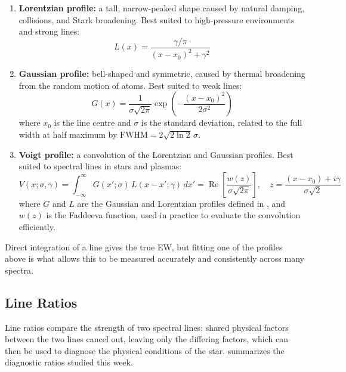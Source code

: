 \documentclass[12pt]{article}
\begin{document}
\begin{enumerate}[leftmargin=*]
  \item \textbf{Lorentzian profile:} a tall, narrow-peaked shape caused by natural damping, collisions, and Stark broadening. Best suited to high-pressure environments and strong lines:
  \begin{equation}
    L(x) = \frac{\gamma/\pi}{(x - x_0)^2 + \gamma^2}
    \label{eq:lorentzian}
  \end{equation}
  \item \textbf{Gaussian profile:} bell-shaped and symmetric, caused by thermal broadening from the random motion of atoms. Best suited to weak lines:
  \begin{equation}
    G(x) = \frac{1}{\sigma\sqrt{2\pi}} \exp\!\left(-\frac{(x - x_0)^2}{2\sigma^2}\right)
    \label{eq:gaussian}
  \end{equation}
  where $x_0$ is the line centre and $\sigma$ is the standard deviation, related to the full width at half maximum by $\mathrm{FWHM} = 2\sqrt{2\ln 2}\,\sigma$.
  \item \textbf{Voigt profile:} a convolution of the Lorentzian and Gaussian profiles. Best suited to spectral lines in stars and plasmas:
  \begin{equation}
    V(x; \sigma, \gamma) = \int_{-\infty}^{\infty} G(x'; \sigma)\, L(x - x'; \gamma)\, dx' = \operatorname{Re}\!\left[\frac{w(z)}{\sigma\sqrt{2\pi}}\right],
    \quad z = \frac{(x - x_0) + i\gamma}{\sigma\sqrt{2}}
    \label{eq:voigt}
  \end{equation}
  where $G$ and $L$ are the Gaussian and Lorentzian profiles defined in , and $w(z)$ is the Faddeeva function, used in practice to evaluate the convolution efficiently.
\end{enumerate}

Direct integration of a line gives the true EW, but fitting one of the profiles above is what allows this to be measured accurately and consistently across many spectra.

\subsection{Line Ratios}

Line ratios compare the strength of two spectral lines: shared physical factors between the two lines cancel out, leaving only the differing factors, which can then be used to diagnose the physical conditions of the star.  summarizes the diagnostic ratios studied this week.
\end{document}
